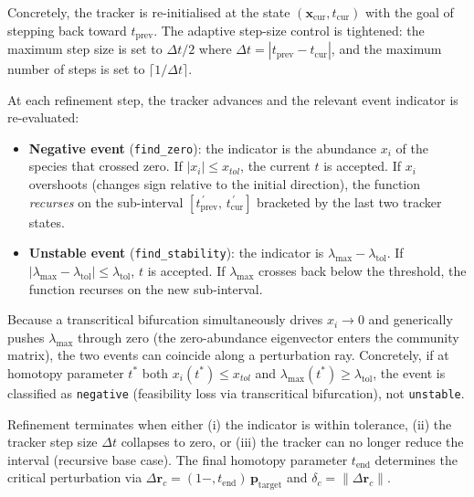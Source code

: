 \documentclass[pdflatex,sn-mathphys-num]{sn-jnl}%
\begin{document}
Concretely, the tracker is re-initialised at the state $(\mathbf{x}_{\mathrm{cur}}, t_{\mathrm{cur}})$ with the goal of stepping back toward $t_{\mathrm{prev}}$. The adaptive step-size control is tightened: the maximum step size is set to $\Delta t/2$ where $\Delta t = |t_{\mathrm{prev}} - t_{\mathrm{cur}}|$, and the maximum number of steps is set to $\lceil 1/\Delta t \rceil$.

At each refinement step, the tracker advances and the relevant event indicator is re-evaluated:
\begin{itemize}
 \item \textbf{Negative event} (\texttt{find\_zero}): the indicator is the abundance $x_i$ of the species that crossed zero. If $|x_i| \le x_{tol}$, the current $t$ is accepted. If $x_i$ overshoots (changes sign relative to the initial direction), the function \emph{recurses} on the sub-interval $[t_{\mathrm{prev}}^{\,\prime},\, t_{\mathrm{cur}}^{\,\prime}]$ bracketed by the last two tracker states.
 \item \textbf{Unstable event} (\texttt{find\_stability}): the indicator is $\lambda_{\max} - \lambda_{\mathrm{tol}}$. If $|\lambda_{\max} - \lambda_{\mathrm{tol}}| \le \lambda_{\mathrm{tol}}$, $t$ is accepted. If $\lambda_{\max}$ crosses back below the threshold, the function recurses on the new sub-interval.
\end{itemize}

Because a transcritical bifurcation simultaneously drives $x_i \to 0$ and generically pushes $\lambda_{\max}$ through zero (the zero-abundance eigenvector enters the community matrix), the two events can coincide along a perturbation ray. Concretely, if at homotopy parameter $t^{*}$ both $x_i(t^{*}) \leq x_{tol}$ and $\lambda_{\max}(t^{*}) \geq \lambda_{\mathrm{tol}}$, the event is classified as \texttt{negative} (feasibility loss via transcritical bifurcation), not \texttt{unstable}.

Refinement terminates when either (i) the indicator is within tolerance, (ii) the tracker step size $\Delta t$ collapses to zero, or (iii) the tracker can no longer reduce the interval (recursive base case). The final homotopy parameter $t_{\mathrm{end}}$ determines the critical perturbation via $\Delta\mathbf{r}_c = (1 - , t_{\mathrm{end}})\, \mathbf{p}_{\mathrm{target}}$ and $\delta_c = \|\Delta\mathbf{r}_c\|$.
\end{document}
